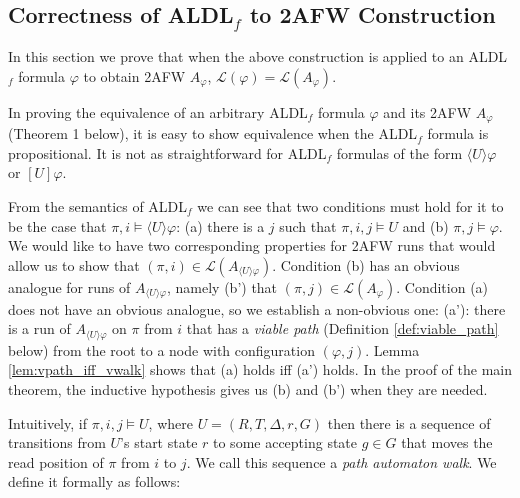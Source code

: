 \documentclass{lmcs}
\theoremstyle{definition}
\newcommand{\dbox}[1]{\langle #1 \rangle}
\newcommand{\bbox}[1]{[ #1 ]}
\DeclareMathOperator{\?}{?}
\begin{document}
\subsection{\texorpdfstring{Correctness of ALDL$_f$ to 2AFW Construction}{Correctness of ALDLf to 2AFW Construction}}

In this section we prove that when the above construction is applied to an ALDL$_f$
formula $\varphi$ to obtain 2AFW $A_\varphi$, $\mathcal{L}(\varphi) = \mathcal{L}(A_\varphi)$. 

In proving the equivalence of an arbitrary ALDL$_f$ formula $\varphi$ and its 2AFW $A_\varphi$ (Theorem 1 below),
it is easy to show equivalence when the ALDL$_f$ formula is propositional. It is not as straightforward for
ALDL$_f$ formulas of the form $\dbox{U}\varphi$ or $\bbox{U}\varphi$.

From the semantics of ALDL$_f$ we can see that two conditions must hold for it to be the case that
$\pi,i \models \dbox{U}\varphi$: (a) there is a $j$ such that $\pi,i,j \models U$ and (b) $\pi,j \models \varphi$.
We would like to have two corresponding properties for 2AFW runs that would allow us to show that $(\pi,i) \in \mathcal{L}(A_{\dbox{U}\varphi})$.
Condition (b) has an obvious analogue for runs of $A_{\dbox{U}\varphi}$, namely (b') that $(\pi,j) \in \mathcal{L}(A_{\varphi})$.
Condition (a) does not have an obvious analogue, so we establish a non-obvious one:
(a'): there is a run of $A_{\dbox{U}\varphi}$ on $\pi$ from $i$ that has a \textit{viable path} (Definition \ref{def:viable_path} below)
from the root to a node with configuration $(\varphi,j)$. Lemma \ref{lem:vpath_iff_vwalk} shows that (a) holds iff (a') holds. In
the proof of the main theorem, the inductive hypothesis gives us (b) and (b') when they are needed.


Intuitively, if $\pi,i,j \models U$, where $U = (R,T,\Delta,r,G)$ then there is a sequence
of transitions from $U$'s start state $r$ to some accepting state $g \in G$ that moves the
read position of $\pi$ from $i$ to $j$. We call this sequence a \textit{path automaton walk}.
We define it formally as follows:
\end{document}
